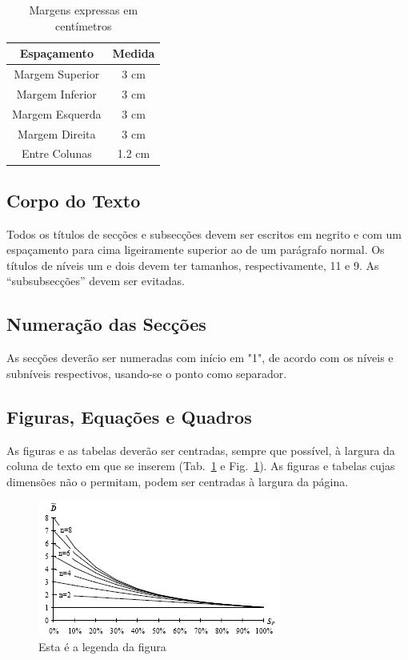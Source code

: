 \documentclass[9pt,a4paper]{extarticle}
\begin{document}
\begin{multicols}{2}
\begin{table}[H]
  \centering
  \caption{Margens expressas em centímetros}
\begin{tabular}{c | c}
	\hline
\textbf{Espaçamento} & \textbf{Medida}\\
	\hline
	\hline
        Margem Superior & 3 cm\\
        Margem Inferior & 3 cm\\
        Margem Esquerda & 3 cm\\
        Margem Direita  & 3 cm\\
        Entre Colunas   & 1.2 cm\\
	\hline
\end{tabular}
  \label{tab:medidas}
\end{table}

\subsection{Corpo do Texto}

Todos os títulos de secções e subsecções devem ser escritos em negrito e com um espaçamento para cima ligeiramente superior ao de um parágrafo normal. 
Os títulos de níveis um e dois devem ter tamanhos, respectivamente, 11 e 9. 
As ``subsubsecções'' devem ser evitadas.

\subsection{Numeração das Secções}

As secções deverão ser numeradas com início em "1", de acordo com os níveis e subníveis respectivos, usando-se o ponto como separador.

\subsection{Figuras, Equações e Quadros}

As figuras e as tabelas deverão ser centradas, sempre que possível, à largura da coluna de texto em que se
inserem (Tab.~\ref{tab:medidas} e Fig.~\ref{fig:figura}). 
As figuras e tabelas cujas dimensões não o permitam, podem ser centradas à largura da página.

\begin{figure}[H]
\centerline{\includegraphics[scale=.6]{figura.png}}
\caption{Esta é a legenda da figura}  
\label{fig:figura}
\end{figure}


\end{multicols}
\end{document}
